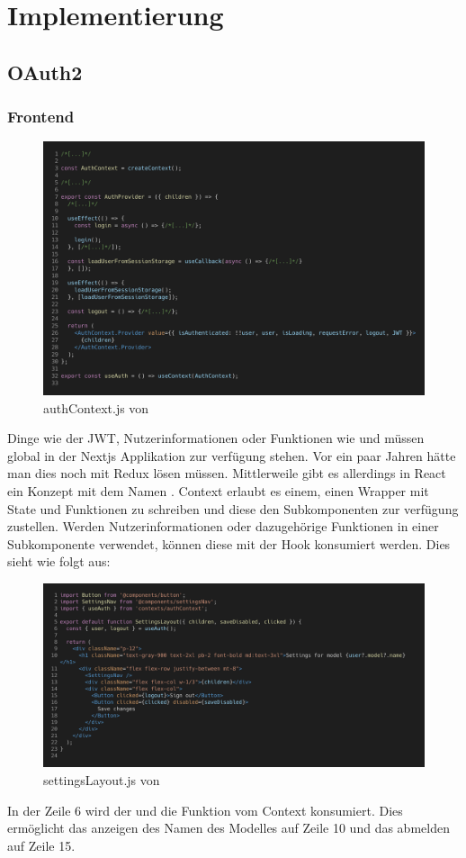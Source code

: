 
\chapter{Implementierung}
\section{OAuth2}
\subsection{Frontend}
\begin{figure}[H]
  \centering
  \includegraphics[width=.95\linewidth]{./images/authContext.png}
  \caption[{authContext.js von }]{authContext.js von }
  \label{fig:authContext}
\end{figure}
Dinge wie der JWT, Nutzerinformationen oder Funktionen wie  und  müssen global in der Nextjs Applikation zur verfügung stehen. Vor ein paar Jahren hätte man dies noch mit Redux lösen müssen. Mittlerweile gibt es allerdings in React ein Konzept mit dem Namen . Context erlaubt es einem, einen Wrapper mit State und Funktionen zu schreiben und diese den Subkomponenten zur verfügung zustellen. Werden Nutzerinformationen oder dazugehörige Funktionen in einer Subkomponente verwendet, können diese mit der  Hook konsumiert werden. Dies sieht wie folgt aus:
\begin{figure}[H]
  \centering
  \includegraphics[width=.95\linewidth]{./images/settingsLayout.js.png}
  \caption[{settingsLayout.js von }]{settingsLayout.js von }
  \label{fig:settingsLayout}
\end{figure}
In der Zeile 6 wird der  und die  Funktion vom Context konsumiert. Dies ermöglicht das anzeigen des Namen des Modelles auf Zeile 10 und das abmelden auf Zeile 15.
